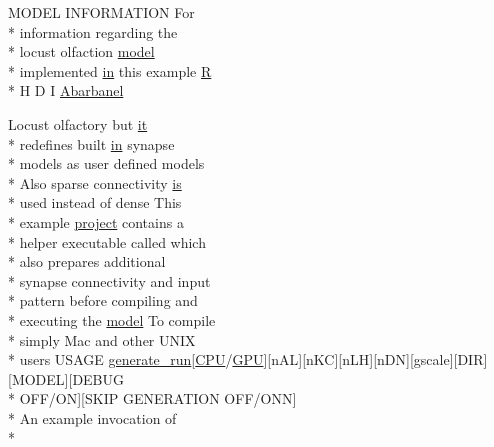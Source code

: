 \begin{DoxyCompactItemize}
M\+O\+D\+E\+L I\+N\+F\+O\+R\+M\+A\+T\+I\+O\+N For \\*
information regarding the \\*
locust olfaction \hyperlink{README_8txt_a69fd801b7213948c12d9dd7eebb3ed14}{model} \\*
implemented \hyperlink{README_8txt_a148897a6b2cc9cff25af80abb13426b0}{in} this example \hyperlink{gen__syns__sparse__izhModel_8cc_ac06fcc1e53c6b21275aec67047473a28}{R} \\*
H D I \hyperlink{userproject_2MBody__userdef__project_2README_8txt_a1b81fe698959b27644c90b33bf8e5a04}{Abarbanel}
\item 
Locust olfactory but \hyperlink{userproject_2PoissonIzh__project_2README_8txt_a3e3bbb6c9b14c38757cf273a117e43e8}{it} \\*
redefines built \hyperlink{README_8txt_a148897a6b2cc9cff25af80abb13426b0}{in} synapse \\*
models as user defined models \\*
Also sparse connectivity \hyperlink{userproject_2MBody__userdef__project_2README_8txt_a7b4e6cf78d14ce882cb8ff127e01babd}{is} \\*
used instead of dense This \\*
example \hyperlink{userproject_2SynDelay__project_2README_8txt_a762c750134e07a31b7965860fd292b51}{project} contains a \\*
helper executable called which \\*
also prepares additional \\*
synapse connectivity and input \\*
pattern before compiling and \\*
executing the \hyperlink{README_8txt_a69fd801b7213948c12d9dd7eebb3ed14}{model} To compile \\*
simply Mac and other U\+N\+I\+X \\*
users U\+S\+A\+G\+E \hyperlink{userproject_2MBody__userdef__project_2README_8txt_a320a215d1e27b4de394be70e90d22863}{generate\+\_\+run}\mbox{[}\hyperlink{README_8txt_a74a069e3c75797de2636c4dd14daa147}{C\+P\+U}/\hyperlink{modelSpec_8h_a39cb9803524b6f3b783344b2f89867b4}{G\+P\+U}\mbox{]}\mbox{[}n\+A\+L\mbox{]}\mbox{[}n\+K\+C\mbox{]}\mbox{[}n\+L\+H\mbox{]}\mbox{[}n\+D\+N\mbox{]}\mbox{[}gscale\mbox{]}\mbox{[}D\+I\+R\mbox{]}\mbox{[}M\+O\+D\+E\+L\mbox{]}\mbox{[}D\+E\+B\+U\+G \\*
O\+F\+F/O\+N\mbox{]}\mbox{[}S\+K\+I\+P G\+E\+N\+E\+R\+A\+T\+I\+O\+N O\+F\+F/O\+N\+N\mbox{]} \\*
An example invocation of \\*

\end{DoxyCompactItemize}
